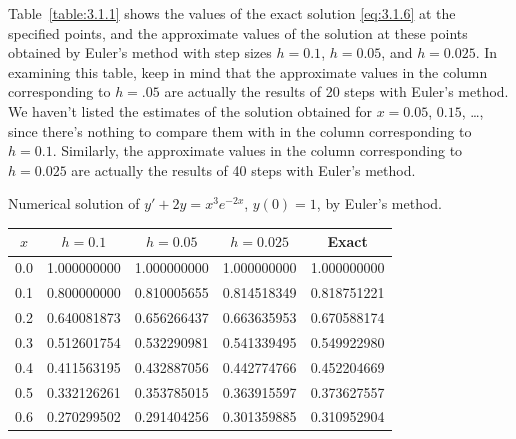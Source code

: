 \begin{examplesolution}
\solution Table~\ref{table:3.1.1} shows the values of the exact solution \eqref{eq:3.1.6} at the
specified points, and the approximate values of the solution at these points obtained by Euler's
method with step sizes $h=0.1$, $h=0.05$, and $h=0.025$. In examining this table, keep in mind that
the approximate values in the column corresponding to $h=.05$ are actually the results of 20 steps
with Euler's method. We haven't listed the estimates of the solution obtained for $x=0.05$, $0.15$,
\dots, since there's nothing to compare them with in the column corresponding to $h=0.1$. Similarly,
the approximate values in the column corresponding to $h=0.025$ are actually the results of 40 steps
with Euler's method.

\begin{newtable}
  \label{table:3.1.1} Numerical solution of $y'+2y=x^{3}e^{-2x}$, $y(0)=1$, by Euler's method.
  \begin{center}
    \begin{tabular}{|c|r|r|r|r|}
      \hline
      \multicolumn{1}{|c|}{$x$} & \multicolumn{1}{|c|}{$h=0.1$} & \multicolumn{1}{|c|}{$h=0.05$} & \multicolumn{1}{|c|}{$h=0.025$} & \multicolumn{1}{|c|}{Exact} \\
      \hline
      0.0                       & 1.000000000                   & 1.000000000                    & 1.000000000                     & 1.000000000                 \\
      0.1                       & 0.800000000                   & 0.810005655                    & 0.814518349                     & 0.818751221                 \\
      0.2                       & 0.640081873                   & 0.656266437                    & 0.663635953                     & 0.670588174                 \\
      0.3                       & 0.512601754                   & 0.532290981                    & 0.541339495                     & 0.549922980                 \\
      0.4                       & 0.411563195                   & 0.432887056                    & 0.442774766                     & 0.452204669                 \\
      0.5                       & 0.332126261                   & 0.353785015                    & 0.363915597                     & 0.373627557                 \\
      0.6                       & 0.270299502                   & 0.291404256                    & 0.301359885                     & 0.310952904                 \\

\end{tabular}
\end{center}
\end{newtable}
\end{examplesolution}
